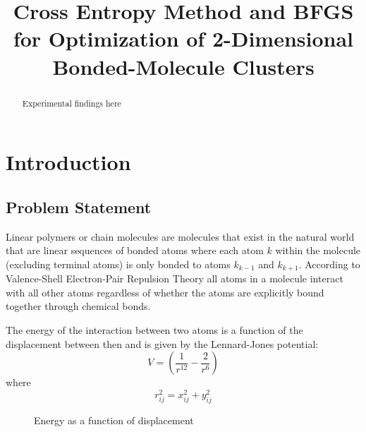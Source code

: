 \documentclass[conference,letterpaper]{IEEEtran}
\begin{document}
\title{Cross Entropy Method and BFGS for Optimization of 2-Dimensional Bonded-Molecule Clusters}
\author{
}

\maketitle

\begin{abstract}
    Experimental findings here
\end{abstract}

%
%   
\section{Introduction}
\subsection{Problem Statement}
\par Linear polymers or chain molecules are molecules that exist in the natural world that are linear sequences of bonded atoms where each atom $k$ within the molecule (excluding terminal atoms) is only bonded to atoms $k_{k - 1}$ and $k_{k + 1}$. According to Valence-Shell Electron-Pair Repulsion Theory all atoms in a molecule interact with all other atoms regardless of whether the atoms are explicitly bound together through chemical bonds.
\par The energy of the interaction between two atoms is a function of the displacement between then and is given by the Lennard-Jones potential:
\begin{equation}
    V = (\frac{1}{r^{12}} - \frac{2}{r^{6}})
\end{equation}
where
\begin{equation}
    r^{2}_{ij} = x^{2}_{ij} + y^{2}_{ij}
\end{equation}

\begin{figure}[h]
    \caption{Energy as a function of displacement}
    \label{energy}
\end{figure}
\end{document}
